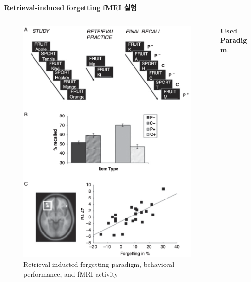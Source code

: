\documentclass{beamer}
\begin{document}
\begin{frame}{\textbf{Retrieval-induced forgetting fMRI 실험}}
  \begin{columns}
    \begin{column}{0.38\textwidth}
      \begin{figure}
        \includegraphics[width=\textwidth]{image/Retrieval-induced_forgetting}
        \caption{Retrieval-inducted forgetting paradigm, behavioral performance, and fMRI activity}
      \end{figure}
    \end{column}
    \hfill
    \begin{column}{0.6\textwidth}
      \textbf{Used Paradigm}:
      \vspace{-0.5em}

\end{column}
\end{columns}
\end{frame}
\end{document}
